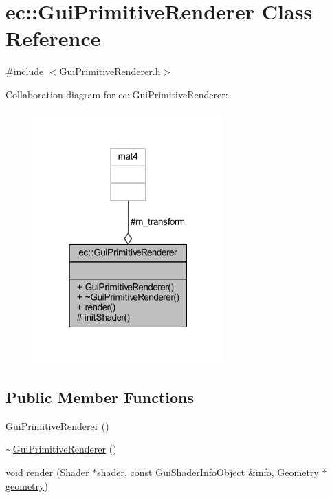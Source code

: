 \hypertarget{classec_1_1_gui_primitive_renderer}{}\section{ec\+:\+:Gui\+Primitive\+Renderer Class Reference}
\label{classec_1_1_gui_primitive_renderer}


{\ttfamily \#include $<$Gui\+Primitive\+Renderer.\+h$>$}



Collaboration diagram for ec\+:\+:Gui\+Primitive\+Renderer\+:\nopagebreak
\begin{figure}[H]
\begin{center}
\leavevmode
\includegraphics[width=208pt]{classec_1_1_gui_primitive_renderer__coll__graph}
\end{center}
\end{figure}
\subsection*{Public Member Functions}
\begin{DoxyCompactItemize}
\item 
\mbox{\hyperlink{classec_1_1_gui_primitive_renderer_ad5dec69952ed7ee82769fecb40a83fe8}{Gui\+Primitive\+Renderer}} ()
\item 
\mbox{\hyperlink{classec_1_1_gui_primitive_renderer_abd5bd68a4ba482a2fa7ef9650c289ca8}{$\sim$\+Gui\+Primitive\+Renderer}} ()
\item 
void \mbox{\hyperlink{classec_1_1_gui_primitive_renderer_abee889f2ebf94c6ae71cc7b39098a002}{render}} (\mbox{\hyperlink{classec_1_1_shader}{Shader}} $\ast$shader, const \mbox{\hyperlink{structec_1_1_gui_shader_info_object}{Gui\+Shader\+Info\+Object}} \&\mbox{\hyperlink{namespaceec_a67e511e8b22e1051ea392cb2f68315d8acaf9b6b99962bf5c2264824231d7a40c}{info}}, \mbox{\hyperlink{classec_1_1_geometry}{Geometry}} $\ast$\mbox{\hyperlink{_resource_type_8h_af12fe3e5d8da3d7bd4c76e44cca2319c}{geometry}})
\end{DoxyCompactItemize}
